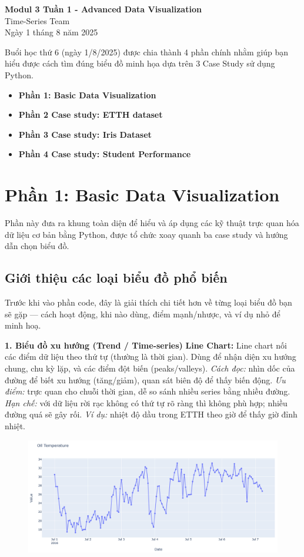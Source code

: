 \documentclass[11pt]{article}
\renewcommand{\maketitle}{%
    \begin{center}
        \fontsize{18}{20}\selectfont\textbf{Modul 3 Tuần 1 - Advanced Data Visualization}\\[1em]
        \fontsize{14}{16}\selectfont Time-Series Team\\[0.5em]
        \fontsize{14}{16}\selectfont Ngày 1 tháng 8 năm 2025
    \end{center}
    \vspace{1.5em} %
}
\begin{document}
\maketitle %

\begin{summarybox}
    Buổi học thứ 6 (ngày 1/8/2025) được chia thành 4 phần chính nhằm giúp bạn hiểu được cách tìm đúng biểu đồ minh họa dựa trên 3 Case Study sử dụng Python.
    \begin{itemize}
        \item \textbf{Phần 1: Basic Data Visualization}
        \item \textbf{Phần 2 Case study: ETTH dataset}
        \item \textbf{Phần 3 Case study: Iris Dataset}
        \item \textbf{Phần 4 Case study: Student Performance}
    \end{itemize}
\end{summarybox}

\section{Phần 1: Basic Data Visualization}
Phần này đưa ra khung toàn diện để hiểu và áp dụng các kỹ thuật trực quan hóa dữ liệu cơ bản bằng Python, được tổ chức xoay quanh ba case study và hướng dẫn chọn biểu đồ.

\subsection{Giới thiệu các loại biểu đồ phổ biến}
Trước khi vào phần code, đây là giải thích chi tiết hơn về từng loại biểu đồ bạn sẽ gặp — cách hoạt động, khi nào dùng, điểm mạnh/nhược, và ví dụ nhỏ để minh hoạ.

\medskip
\noindent \textbf{1. Biểu đồ xu hướng (Trend / Time-series)}
\medskip
\textbf{Line Chart:} Line chart nối các điểm dữ liệu theo thứ tự (thường là thời gian). Dùng để nhận diện xu hướng chung, chu kỳ lặp, và các điểm đột biến (peaks/valleys).
\textit{Cách đọc:} nhìn dốc của đường để biết xu hướng (tăng/giảm), quan sát biên độ để thấy biến động.
\textit{Ưu điểm:} trực quan cho chuỗi thời gian, dễ so sánh nhiều series bằng nhiều đường.
\textit{Hạn chế:} với dữ liệu rời rạc không có thứ tự rõ ràng thì không phù hợp; nhiều đường quá sẽ gây rối.
\textit{Ví dụ:} nhiệt độ dầu trong ETTH theo giờ để thấy giờ đỉnh nhiệt.
\begin{figure}[H]
    \centering
    \includegraphics[width=0.4\linewidth]{images/lineC.png}
\end{figure}
\end{document}
